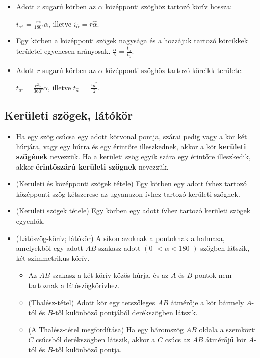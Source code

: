 \documentclass[a4paper,11pt]{article}
\begin{document}
\begin{itemize}
\item Adott $r$ sugarú körben az $\alpha$ középponti szöghöz tartozó körív hossza:
\begin{center}
$i_{\alpha^\circ} = \frac{r\pi}{180^\circ}\alpha$, illetve $i_{\hat{\alpha}} = r\hat{\alpha}$.
\end{center}
\item Egy körben a középponti szögek nagysága és a hozzájuk tartozó körcikkek területei egyenesen arányosak. $ \frac{\alpha}{\beta} = \frac{t_\alpha}{t_\beta}$.
\item Adott $r$ sugarú körben az $\alpha$ középponti szöghöz tartozó körcikk területe:
\begin{center}
$t_{a^\circ} = \frac{r^2\pi}{360^\circ}\alpha$, illetve $t_{\hat{a}}=$  $\frac{^i\hat{a}^r}{2}$.
\end{center}
\end{itemize}
\subsection*{Kerületi szögek, látókör}
\begin{itemize}
\item Ha egy szög csúcsa egy adott körvonal pontja, szárai pedig vagy a kör két húrjára, vagy egy húrra és egy érintőre illeszkednek, akkor a kör \textbf{kerületi szögének} nevezzük. Ha a kerületi szög egyik szára egy érintőre illeszkedik, akkor \textbf{érintőszárú kerületi szögnek} nevezzük.
\item (Kerületi és középponti szögek tétele) Egy körben egy adott ívhez tartozó középponti szög kétszerese az ugyanazon ívhez tartozó kerületi szögnek.
\item (Kerületi szögek tétele) Egy körben egy adott ívhez tartozó kerületi szögek egyenlők.
\item (Látószög-körív; látókör) A síkon azoknak a pontoknak a halmaza, amelyekből egy adott $AB$ szakasz adott $(0^\circ < \alpha < 180^\circ)$ szögben látszik, két szimmetrikus körív.
\begin{itemize}[label=$\circ$]
\item Az $AB$ szakasz  a két körív közös húrja, és az $A$ és $B$ pontok nem tartoznak a látószögkörívhez.
\item (Thalész-tétel) Adott kör egy tetszőleges $AB$ átmérője a kör bármely $A$-tól és $B$-től különböző pontjából derékszögben látszik.
\item (A Thalész-tétel megfordítása) Ha egy háromszög $AB$ oldala a szemközti $C$ csúcsból derékszögben látszik, akkor a $C$ csúcs az $AB$ átmérőjű kör $A$-tól és $B$-től különböző pontja.
\end{itemize}
\end{itemize}
\end{document}
